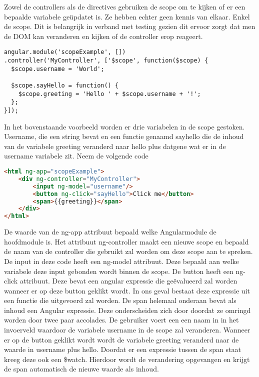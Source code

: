\documentclass[a4paper,11pt]{article}
\begin{document}
Zowel de controllers als de directives gebruiken de scope om te kijken of er een bepaalde variabele geüpdatet is. Ze hebben echter geen kennis van elkaar. Enkel de scope. Dit is belangrijk in verband met testing gezien dit ervoor zorgt dat men de DOM kan veranderen en kijken of de controller erop reageert.

\begin{lstlisting}
angular.module('scopeExample', [])
.controller('MyController', ['$scope', function($scope) {
  $scope.username = 'World';

  $scope.sayHello = function() {
    $scope.greeting = 'Hello ' + $scope.username + '!';
  };
}]);
\end{lstlisting}

In het bovenstaande voorbeeld worden er drie variabelen in de scope gestoken. Username, die een string bevat en een functie genaamd sayhello die de inhoud van de variabele greeting veranderd naar hello plus datgene wat er in de username variabele zit. Neem de volgende code

\begin{lstlisting}[language=html]
<html ng-app="scopeExample">
	<div ng-controller="MyController">
		<input ng-model="username"/>
		<button ng-click="sayHello">Click me</button>
		<span>{{greeting}}</span>
	</div>
</html>
\end{lstlisting}
De waarde van de ng-app attribuut bepaald welke Angularmodule de hoofdmodule is. Het attribuut ng-controller maakt een nieuwe scope en bepaald de naam van de controller die gebruikt zal worden om deze scope aan te spreken. De input in deze code heeft een ng-model attribuut. Deze bepaald aan welke variabele deze input gebonden wordt binnen de scope. De button heeft een ng-click attribuut. Deze bevat een angular expressie die geëvalueerd zal worden wanneer er op deze button geklikt wordt. In ons geval bestaat deze expressie uit een functie die uitgevoerd zal worden. De span helemaal onderaan bevat als inhoud een Angular expressie. Deze onderscheiden zich door doordat ze omringd worden door twee paar accolades. De gebruiker voert een een naam in in het invoerveld waardoor de variabele username in de scope zal veranderen. Wanneer er op de button geklikt wordt wordt de variabele greeting veranderd naar de waarde in username plus hello. Doordat er een expressie tussen de span staat kreeg deze ook een \$watch. Hierdoor wordt de verandering opgevangen en krijgt de span automatisch de nieuwe waarde als inhoud.
\end{document}
